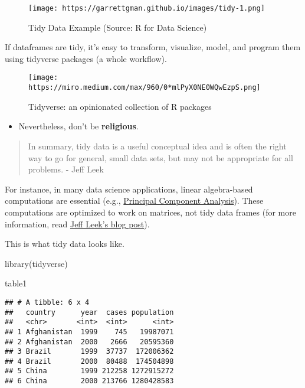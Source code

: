 \documentclass[
]{book}
\newenvironment{Shaded}{\begin{snugshade}}{\end{snugshade}}
\newcommand{\FunctionTok}[1]{\textcolor[rgb]{0.00,0.00,0.00}{#1}}
\newcommand{\NormalTok}[1]{#1}
\providecommand{\tightlist}{%
  \setlength{\itemsep}{0pt}\setlength{\parskip}{0pt}}
\begin{document}
\begin{figure}
\centering
\texttt{[image: https://garrettgman.github.io/images/tidy-1.png]}
\caption{Tidy Data Example (Source: R for Data Science)}
\end{figure}

If dataframes are tidy, it's easy to transform, visualize, model, and program them using tidyverse packages (a whole workflow).

\begin{figure}
\centering
\texttt{[image: https://miro.medium.com/max/960/0*mlPyX0NE0WQwEzpS.png]}
\caption{Tidyverse: an opinionated collection of R packages}
\end{figure}

\begin{itemize}
\tightlist
\item
  Nevertheless, don't be \textbf{religious}.
\end{itemize}

\begin{quote}
In summary, tidy data is a useful conceptual idea and is often the right way to go for general, small data sets, but may not be appropriate for all problems. - Jeff Leek
\end{quote}

For instance, in many data science applications, linear algebra-based computations are essential (e.g., \href{https://www.math.upenn.edu/~kazdan/312S13/JJ/PCA-JJ.pdf}{Principal Component Analysis}). These computations are optimized to work on matrices, not tidy data frames (for more information, read \href{https://simplystatistics.org/2016/02/17/non-tidy-data/}{Jeff Leek's blog post}).

This is what tidy data looks like.

\begin{Shaded}
\begin{Highlighting}[]
\FunctionTok{library}\NormalTok{(tidyverse)}

\NormalTok{table1}
\end{Highlighting}
\end{Shaded}

\begin{verbatim}
## # A tibble: 6 x 4
##   country      year  cases population
##   <chr>       <int>  <int>      <int>
## 1 Afghanistan  1999    745   19987071
## 2 Afghanistan  2000   2666   20595360
## 3 Brazil       1999  37737  172006362
## 4 Brazil       2000  80488  174504898
## 5 China        1999 212258 1272915272
## 6 China        2000 213766 1280428583
\end{verbatim}
\end{document}
